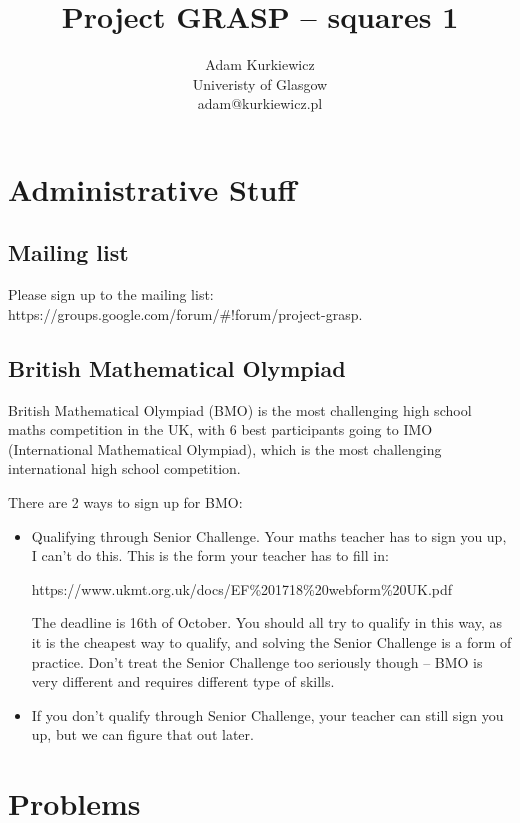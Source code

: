 \documentclass{article}
\title{Project GRASP -- squares 1}
\author{Adam Kurkiewicz\\
  \small{Univeristy of Glasgow}\\
  \small{adam@kurkiewicz.pl}}
\begin{document}
  \maketitle
  \section{Administrative Stuff}
  
  \subsection{Mailing list}
  Please sign up to the mailing list: https://groups.google.com/forum/\#!forum/project-grasp.
  
  \subsection{British Mathematical Olympiad}
  British Mathematical Olympiad (BMO) is the most challenging high school maths competition in the UK, with 6 best participants going to IMO (International Mathematical Olympiad), which is the most challenging international high school competition.
  
  There are 2 ways to sign up for BMO:
  
  \begin{itemize}
    \item Qualifying through Senior Challenge. Your maths teacher has to sign you up, I can't do this. This is the form your teacher has to fill in:
    
    https://www.ukmt.org.uk/docs/EF\%201718\%20webform\%20UK.pdf
    
    The deadline is 16th of October. You should all try to qualify in this way, as it is the cheapest way to qualify, and solving the Senior Challenge is a form of practice. Don't treat the Senior Challenge too seriously though -- BMO is very different and requires different type of skills.
    \item If you don't qualify through Senior Challenge, your teacher can still sign you up, but we can figure that out later.
  \end{itemize}
  
  \section{Problems}
  
\end{document}
